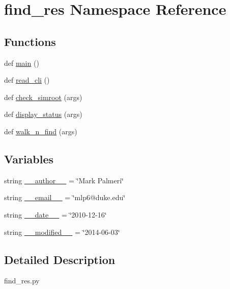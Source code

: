 \hypertarget{namespacefind__res}{}\section{find\+\_\+res Namespace Reference}
\label{namespacefind__res}
\subsection*{Functions}
\begin{DoxyCompactItemize}
\item 
def \hyperlink{namespacefind__res_a2af11f6ebb6faa1ff54caa3ff7c8e4d0}{main} ()
\item 
def \hyperlink{namespacefind__res_a6f61d01cd17b47a7fbcff4eb192a5945}{read\+\_\+cli} ()
\item 
def \hyperlink{namespacefind__res_aee52e3c514f0caefde7bf94ad974b968}{check\+\_\+simroot} (args)
\item 
def \hyperlink{namespacefind__res_aee022bc69aa6356af7c2d9a88000be35}{display\+\_\+status} (args)
\item 
def \hyperlink{namespacefind__res_afd9f8a68a477fad3218a71d600258851}{walk\+\_\+n\+\_\+find} (args)
\end{DoxyCompactItemize}
\subsection*{Variables}
\begin{DoxyCompactItemize}
\item 
string \hyperlink{namespacefind__res_a728806305227088f33bee63ae674ee1e}{\+\_\+\+\_\+author\+\_\+\+\_\+} = \char`\"{}Mark Palmeri\char`\"{}
\item 
string \hyperlink{namespacefind__res_a61ba9c9ac672df8b70658896ffbc5166}{\+\_\+\+\_\+email\+\_\+\+\_\+} = \char`\"{}mlp6@duke.\+edu\char`\"{}
\item 
string \hyperlink{namespacefind__res_a2eb1844b89b617f8d362c2c45c8295ab}{\+\_\+\+\_\+date\+\_\+\+\_\+} = \char`\"{}2010-\/12-\/16\char`\"{}
\item 
string \hyperlink{namespacefind__res_a4828c0504a776b6445463dde90113e4f}{\+\_\+\+\_\+modified\+\_\+\+\_\+} = \char`\"{}2014-\/06-\/03\char`\"{}
\end{DoxyCompactItemize}


\subsection{Detailed Description}
\begin{DoxyVerb}find_res.py
\end{DoxyVerb}
 

